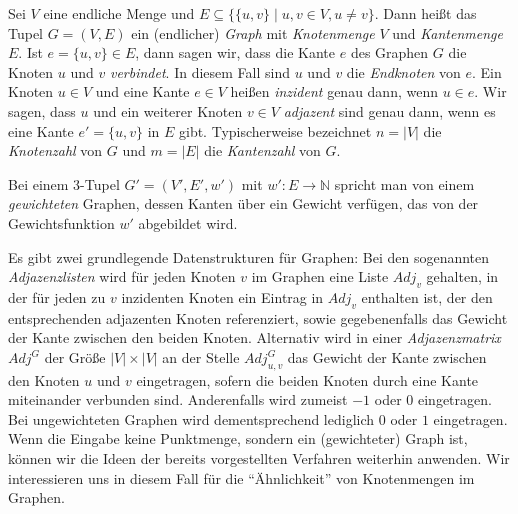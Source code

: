 \begin{definition}[Graph]
\label{def:graph}
	Sei $V$ eine endliche Menge und $E \subseteq \{ \{ u,v \} \mid u, v \in V, u \neq v \}$.
	Dann heißt das Tupel $G = (V, E)$ ein (endlicher) \emph{Graph} mit \emph{Knotenmenge} $V$ und
	\emph{Kantenmenge} $E$. Ist $e = \{ u,v \} \in E$, dann sagen wir, dass die Kante $e$ des Graphen $G$
	die Knoten $u$ und $v$ \emph{verbindet}. In diesem Fall sind $u$ und $v$ die \emph{Endknoten}
	von $e$.
	Ein Knoten $u \in V$ und eine Kante $e \in V$ heißen \emph{inzident}
	genau dann, wenn $u \in e$. Wir sagen, dass $u$ und ein weiterer Knoten $v \in V$ \emph{adjazent}
	sind genau dann, wenn es eine Kante $e' = \{ u,v \}$ in $E$ gibt.
	Typischerweise bezeichnet $n = \left|V\right|$ die \emph{Knotenzahl} von $G$ und
	$m = \left|E\right|$ die \emph{Kantenzahl} von $G$.
	
	Bei einem 3-Tupel $G' = (V', E', w')$ mit $w' : E \rightarrow \mathbb{N}$ spricht man von einem \emph{gewichteten} Graphen,
	dessen Kanten über ein Gewicht verfügen, das von der Gewichtsfunktion $w'$ abgebildet wird.
\end{definition}
Es gibt zwei grundlegende Datenstrukturen für Graphen: Bei den sogenannten
\emph{Adjazenzlisten} wird für jeden Knoten $v$ im Graphen eine Liste $Adj_v$ gehalten, in der für jeden zu $v$ inzidenten
Knoten ein Eintrag in $Adj_v$ enthalten ist, der den entsprechenden adjazenten Knoten referenziert, sowie gegebenenfalls das
Gewicht der Kante zwischen den beiden Knoten.
Alternativ wird in einer
\emph{Adjazenzmatrix} $Adj^G$ der Größe $\left|V\right| \times \left|V\right|$ an der Stelle $Adj^G_{u,v}$ das Gewicht der Kante
zwischen den Knoten $u$ und $v$ eingetragen, sofern die beiden Knoten durch eine Kante miteinander verbunden sind.
Anderenfalls wird zumeist $-1$ oder $0$ eingetragen. Bei ungewichteten Graphen wird dementsprechend lediglich $0$ oder $1$
eingetragen.
\absatz
Wenn die Eingabe keine Punktmenge, sondern ein (gewichteter) Graph ist, können wir die Ideen der bereits vorgestellten Verfahren
weiterhin anwenden. Wir interessieren uns in diesem Fall für die "`Ähnlichkeit"' von Knotenmengen im Graphen.

